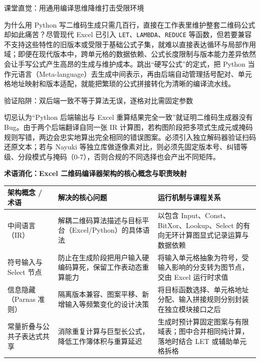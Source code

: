 \documentclass[UTF8,a4paper,11pt,fontset=fandol]{ctexart}
\begin{document}
\begin{knowledgebox}{课堂直觉：用通用编译思维降维打击受限环境}

为什么用 Python 写二维码生成只需几百行，直接在工作表里维护整套二维码公式却如此痛苦？尽管现代 Excel 已引入 \texttt{LET}、\texttt{LAMBDA}、\texttt{REDUCE} 等函数，但若要兼容不支持这些特性的旧版本或受限于基础公式子集，就难以直接表达循环与局部作用域；即便在现代版本中，跨单元格的数据依赖、公式长度限制与版本能力差异依然会让手写公式产生高昂的生成与维护成本。跳出“硬写公式”的定式，把 Python 当作元语言（Meta-language）去生成中间表示，再由后端自动管理括号配对、单元格地址映射和版本适配，就能把繁琐的公式拼接转化为清晰的编译流水线。

\end{knowledgebox}

\begin{warningbox}{验证陷阱：双后端一致不等于算法无误，逐格对比需固定参数}

切忌认为“Python 后端输出与 Excel 重算结果完全一致”就证明二维码生成器没有 Bug。由于两个后端翻译自同一张 IR 计算图，若构图阶段把多项式生成元或掩码规则写错，两边会忠实地算出完全相同的错误图案。必须引入独立解码器验证扫码还原文本；若与 Nayuki 等独立库做逐像素对比，则必须先固定版本号、纠错等级、分段模式与掩码（0-7），否则合规的不同选择也会产出不同矩阵。

\end{warningbox}

\par{}\textbf{术语消化：Excel 二维码编译器架构的核心概念与职责映射}

\begin{center}\small\begin{tabularx}{\linewidth}{YYY}

\toprule

架构概念 / 术语 & 解决的核心问题 & 运行机制与课程关系\\\midrule

中间语言（IR） & 解耦二维码算法描述与目标平台（Excel/Python）的具体语法 & 以包含 Input、Const、BitXor、Lookup、Select 的有向无环计算图显式记录运算与数据依赖\\[3pt]

符号输入与 Select 节点 & 防止在生成阶段把用户输入硬编码算死，保留工作表动态重算能力 & 将输入单元格抽象为符号，受输入影响的分支转为图节点，交由 Excel 运行时求值\\[3pt]

信息隐藏（Parnas 准则） & 隔离版本兼容、图案平移、新增输入等频繁变化的设计决策 & 将目标函数选择、单元格地址分配、输入拼接规则分别封装在独立模块接口之后\\[3pt]

常量折叠与公共子表达式共享 & 消除重复计算与巨型长公式，降低工作簿体积与重算延迟 & 生成时预计算固定图案与有限域表；图中合并相同纯计算，落地时结合 LET 或辅助单元格拆格\\[3pt]

\bottomrule\end{tabularx}\end{center}
\end{document}
